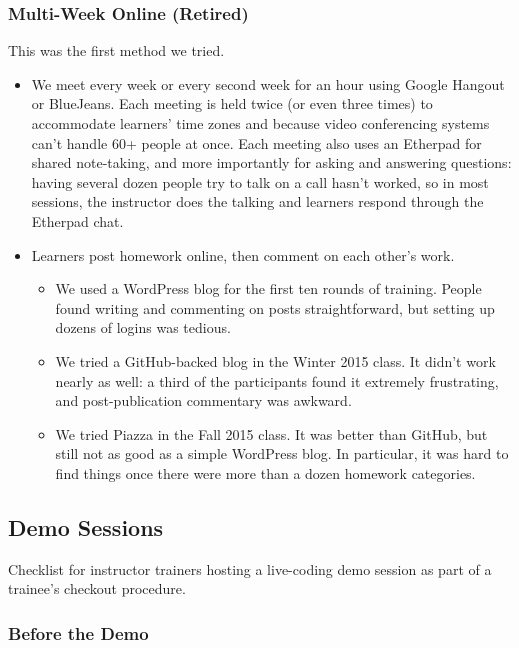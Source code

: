 \subsubsection{Multi-Week Online
(Retired)}\label{multi-week-online-retired}

This was the first method we tried.

\begin{itemize}
\item
  We meet every week or every second week for an hour using Google
  Hangout or BlueJeans. Each meeting is held twice (or even three times)
  to accommodate learners' time zones and because video conferencing
  systems can't handle 60+ people at once. Each meeting also uses an
  Etherpad for shared note-taking, and more importantly for asking and
  answering questions: having several dozen people try to talk on a call
  hasn't worked, so in most sessions, the instructor does the talking
  and learners respond through the Etherpad chat.
\item
  Learners post homework online, then comment on each other's work.

  \begin{itemize}
  \itemsep1pt\parskip0pt
  \item
    We used a WordPress blog for the first ten rounds of training.
    People found writing and commenting on posts straightforward, but
    setting up dozens of logins was tedious.
  \item
    We tried a GitHub-backed blog in the Winter 2015 class. It didn't
    work nearly as well: a third of the participants found it extremely
    frustrating, and post-publication commentary was awkward.
  \item
    We tried Piazza in the Fall 2015 class. It was better than GitHub,
    but still not as good as a simple WordPress blog. In particular, it
    was hard to find things once there were more than a dozen homework
    categories.
  \end{itemize}
\end{itemize}

\subsection{Demo Sessions}\label{demo-sessions}

Checklist for instructor trainers hosting a live-coding demo session as
part of a trainee's checkout procedure.

\subsubsection{Before the Demo}\label{before-the-demo}

